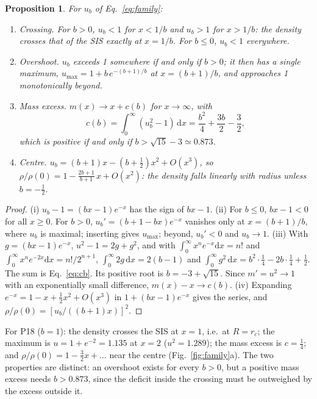 \documentclass[11pt,a4paper]{article}
\newtheorem{proposition}{Proposition}
\theoremstyle{remark}
\newcommand{\rc}{r_c}
\newcommand{\dd}{\mathrm{d}}
\begin{document}
\begin{proposition}\label{prop:props}
For $u_b$ of Eq.~\eqref{eq:family}:
\begin{enumerate}
\item[(i)] \emph{Crossing.} For $b>0$, $u_b<1$ for $x<1/b$ and $u_b>1$ for $x>1/b$: the
  density crosses that of the SIS exactly at $x=1/b$. For $b\le0$, $u_b<1$ everywhere.
\item[(ii)] \emph{Overshoot.} $u_b$ exceeds 1 somewhere if and only if $b>0$; it then
  has a single maximum, $u_{\max}=1+b\,e^{-(b+1)/b}$ at $x=(b+1)/b$, and approaches 1
  monotonically beyond.
\item[(iii)] \emph{Mass excess.} $m(x)\to x+c(b)$ for $x\to\infty$, with
  \begin{equation}
    c(b)=\int_0^\infty(u_b^2-1)\,\dd x=\frac{b^2}{4}+\frac{3b}{2}-\frac32 ,
    \label{eq:cb}
  \end{equation}
  which is positive if and only if $b>\sqrt{15}-3\simeq0.873$.
\item[(iv)] \emph{Centre.} $u_b=(b+1)x-(b+\tfrac12)x^2+O(x^3)$, so
  $\rho/\rho(0)=1-\frac{2b+1}{b+1}\,x+O(x^2)$: the density falls linearly with radius
  unless $b=-\tfrac12$.
\end{enumerate}
\end{proposition}
\begin{proof}
(i) $u_b-1=(bx-1)e^{-x}$ has the sign of $bx-1$. (ii) For $b\le0$, $bx-1<0$ for all
$x\ge0$. For $b>0$, $u_b'=(b+1-bx)e^{-x}$ vanishes only at $x=(b+1)/b$, where $u_b$ is
maximal; inserting gives $u_{\max}$; beyond, $u_b'<0$ and $u_b\to1$. (iii) With
$g=(bx-1)e^{-x}$, $u^2-1=2g+g^2$, and with $\int_0^\infty x^ne^{-x}\dd x=n!$ and
$\int_0^\infty x^ne^{-2x}\dd x=n!/2^{n+1}$,
$\int_0^\infty2g\,\dd x=2(b-1)$ and
$\int_0^\infty g^2\,\dd x=b^2\cdot\tfrac14-2b\cdot\tfrac14+\tfrac12$. The sum is
Eq.~\eqref{eq:cb}. Its positive root is $b=-3+\sqrt{15}$. Since $m'=u^2\to1$ with an
exponentially small difference, $m(x)-x\to c(b)$. (iv) Expanding $e^{-x}=1-x+\tfrac12x^2
+O(x^3)$ in $1+(bx-1)e^{-x}$ gives the series, and
$\rho/\rho(0)=[u_b/((b+1)x)]^2$.
\end{proof}

For P18 ($b=1$): the density crosses the SIS at $x=1$, i.e.\ at $R=\rc$; the maximum
is $u=1+e^{-2}=1.135$ at $x=2$ ($u^2=1.289$); the mass excess is $c=\tfrac14$; and
$\rho/\rho(0)=1-\tfrac32x+\dots$ near the centre (Fig.~\ref{fig:family}a). The two
properties are distinct: an overshoot exists for every $b>0$, but a positive mass excess
needs $b>0.873$, since the deficit inside the crossing must be outweighed by the excess
outside it.
\end{document}
